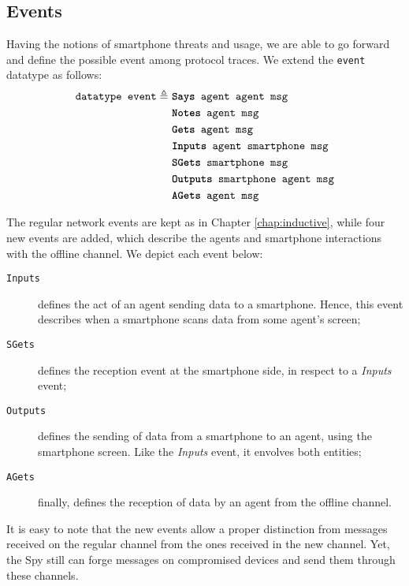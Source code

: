 \subsection{Events}
Having the notions of smartphone threats and usage, we are able to go forward and define the possible event among protocol traces. We extend the \texttt{event} datatype as follows:
%
\begin{equation*}
  \begin{split}
    \texttt{datatype event} \triangleq \
    & \texttt{\textbf{Says} agent agent msg} \\
    & \texttt{\textbf{Notes} agent msg} \\
    & \texttt{\textbf{Gets} agent msg} \\
    & \texttt{\textbf{Inputs} agent smartphone msg} \\
    & \texttt{\textbf{SGets} smartphone msg} \\
    & \texttt{\textbf{Outputs} smartphone agent msg} \\
    & \texttt{\textbf{AGets} agent msg}
  \end{split}
\end{equation*}

The regular network events are kept as in Chapter \ref{chap:inductive}, while four new events are added, which describe the agents and smartphone interactions with the offline channel. We depict each event below:

\begin{description}
  \item[\texttt{Inputs}] defines the act of an agent sending data to a smartphone. Hence, this event describes when a smartphone scans data from some agent's screen;

  \item[\texttt{SGets}] defines the reception event at the smartphone side, in respect to a \textit{Inputs} event;

  \item[\texttt{Outputs}] defines the sending of data from a smartphone to an agent, using the smartphone screen. Like the \textit{Inputs} event, it envolves both entities;

  \item[\texttt{AGets}] finally, defines the reception of data by an agent from the offline channel.
\end{description}

It is easy to note that the new events allow a proper distinction from messages received on the regular channel from the ones received in the new channel. Yet, the Spy still can forge messages on compromised devices and send them through these channels.

